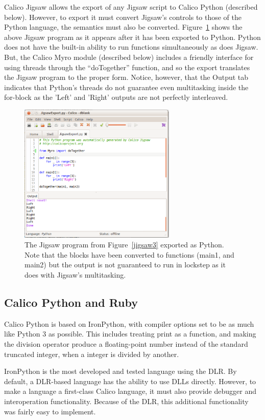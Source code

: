 \documentclass[preprint]{sigplanconf}
\begin{document}
Calico Jigsaw allows the export of any Jigsaw script to Calico Python
(described below). However, to export it must convert Jigsaw's
controls to those of the Python language, the semantics must also be
converted. Figure~\ref{jigsaw4} shows the above Jigsaw program as it
appears after it has been exported to Python. Python does not have the
built-in ability to run functions simultaneously as does Jigsaw. But,
the Calico Myro module (described below) includes a friendly interface
for using threads through the ``doTogether'' function, and so the
export translates the Jigsaw program to the proper form. Notice,
however, that the Output tab indicates that Python's threads do not
guarantee even multitasking inside the for-block as the 'Left' and
'Right' outputs are not perfectly interleaved.

\begin{figure}[h!]
  \centering
    \includegraphics[width=75mm]{jigsaw4.eps} 
  \caption{The Jigsaw program from Figure~\ref{jigsaw3} exported
    as Python. Note that the blocks have been converted to functions
    (main1, and main2) but the output is not guaranteed to run in
    lockstep as it does with Jigsaw's multitasking.}
  \label{jigsaw4}
\end{figure}

\subsection{Calico Python and Ruby}

Calico Python is based on IronPython, with compiler options set to be
as much like Python 3 as possible. This includes treating print as a
function, and making the division operator produce a floating-point
number instead of the standard truncated integer, when a integer is
divided by another.

IronPython is the most developed and tested language using the DLR.
By default, a DLR-based language has the ability to use DLLs
directly. However, to make a language a first-class Calico language,
it must also provide debugger and interoperation
functionality. Because of the DLR, this additional functionality was
fairly easy to implement.
\end{document}
